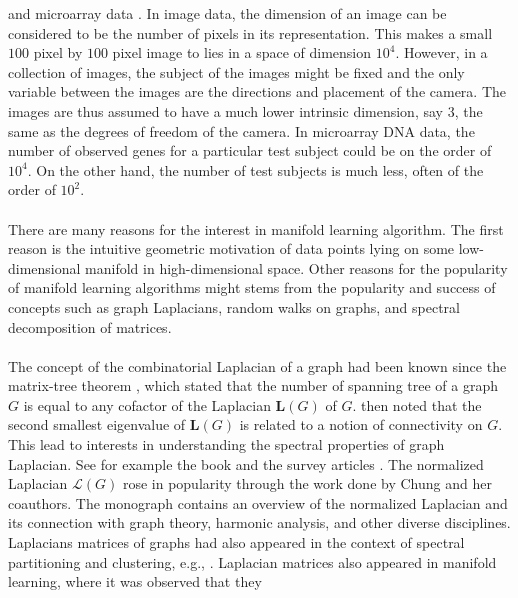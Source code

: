 \citep{tenebaum00:_global_geomet_framew_nonlin_dimen_reduc,bregler95:_nonlin,bregler94:_surfac}
and microarray data \citep{wouters03:_graph}. In image data, the
dimension of an image can be considered to be the number of pixels in
its representation. This makes a small $100$ pixel by $100$ pixel
image to lies in a space of dimension $10^4$. However, in a collection
of images, the subject of the images might be fixed and the only
variable between the images are the directions and placement of the
camera. The images are thus assumed to have a much lower intrinsic
dimension, say $3$, the same as the degrees of freedom of the
camera. In microarray DNA data, the number of observed genes for a
particular test subject could be on the order of $10^4$. On the other
hand, the number of test subjects is much less, often of the order of
$10^2$.
\\ \\
%
%
\noindent
There are many reasons for the interest in manifold learning
algorithm. The first reason is the intuitive geometric motivation of
data points lying on some low-dimensional manifold in high-dimensional
space. Other reasons for the popularity of manifold learning
algorithms might stems from the popularity and success of concepts
such as graph Laplacians, random
walks on graphs, and spectral decomposition of matrices.  \\ \\
%
\noindent The concept of the combinatorial Laplacian of a graph had
been known since the matrix-tree theorem
\citep{kirchhoff47:_uber_aufl_gleic_str}, which stated that the number
of spanning tree of a graph $G$ is equal to any cofactor of the
Laplacian $\mathbf{L}(G)$ of $G$. \citet{fiedler73:_algeb} then noted
that the second smallest eigenvalue of $\mathbf{L}(G)$ is related to a
notion of connectivity on $G$. This lead to interests in
understanding the spectral properties of graph Laplacian. See for
example the book \citet{cvetkovic80:_spect_graph_theor_applic} and the
survey articles \citet{merris94:_laplac,mohar91:_graph}. The
normalized Laplacian $\bm{\mathcal{L}}(G)$ rose in popularity through
the work done by Chung and her coauthors. The monograph
\citet{chung97:_spect_graph_theor} contains an overview of the
normalized Laplacian and its connection with graph theory, harmonic
analysis, and other diverse disciplines. Laplacians matrices of graphs
had also appeared in the context of spectral partitioning and
clustering, e.g.,
\citet{scott90:_featur,shi00:_normal,ng02,weiss9:_segmen}. Laplacian matrices
also appeared in manifold learning, where it was observed that they
